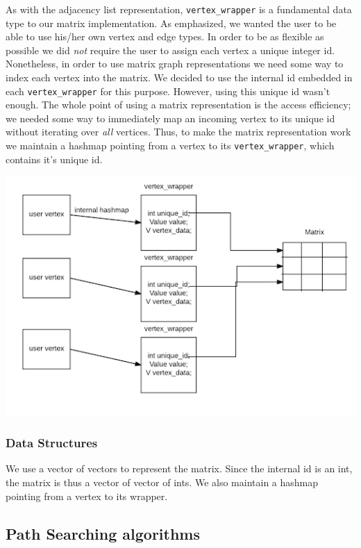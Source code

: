 \documentclass{article}
\begin{document}
\subsubsection{}
As with the adjacency list representation, \texttt{vertex\_wrapper} is a fundamental data type to our matrix implementation. As emphasized, we wanted the user to be able to use his/her own vertex and edge types. In order to be as flexible as possible we did \emph{not} require the user to assign each vertex a unique integer id. Nonetheless, in order to use matrix graph representations we need some way to index each vertex into the matrix. We decided to use the internal id embedded in each \texttt{vertex\_wrapper} for this purpose. However, using this unique id wasn't enough. The whole point of using a matrix representation is the access efficiency; we needed some way to immediately map an incoming vertex to its unique id without iterating over \emph{all} vertices. Thus, to make the matrix representation work we maintain a hashmap pointing from a vertex to its \texttt{vertex\_wrapper}, which contains it's unique id. 

\includegraphics{matrix}

\subsubsection{Data Structures}
We use a vector of vectors to represent the matrix. Since the internal id is an int, the matrix is thus a vector of vector of ints. We also maintain a hashmap pointing from a vertex to its wrapper.

\subsection{Path Searching algorithms}
\end{document}
